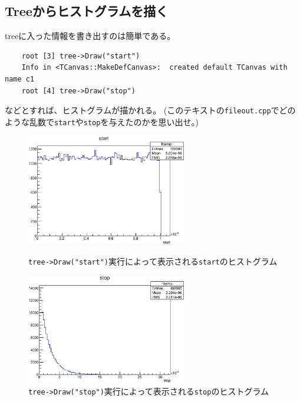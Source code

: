 \documentclass{jarticle}
\begin{document}
  \subsection{Treeからヒストグラムを描く}
  treeに入った情報を書き出すのは簡単である。
\begin{verbatim}
	root [3] tree->Draw("start")
	Info in <TCanvas::MakeDefCanvas>:  created default TCanvas with name c1
	root [4] tree->Draw("stop")
\end{verbatim}
などとすれば、ヒストグラムが描かれる。
(このテキストの\verb|fileout.cpp|でどのような乱数で\verb|start|や\verb|stop|を与えたのかを思い出せ。)

\begin{figure}[htbp]
 \begin{minipage}{0.45\hsize}
  \begin{center}
   \includegraphics[width = 70mm]{./picture/meettreecanvas1.eps}
  \end{center}
  \caption{\texttt{tree->Draw("start")}実行によって表示される\texttt{start}のヒストグラム}
  \label{Fig:meettreecanvas1}
 \end{minipage}
 \begin{minipage}{0.45\hsize}
  \begin{center}
   \includegraphics[width = 70mm]{./picture/meettreecanvas2.eps}
  \end{center}
  \caption{\texttt{tree->Draw("stop")}実行によって表示される\texttt{stop}のヒストグラム}
  \label{Fig:meettreecanvas2}
 \end{minipage}
\end{figure}
\end{document}
